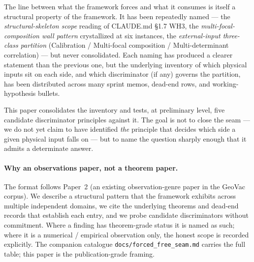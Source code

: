 \documentclass[11pt,a4paper]{article}
\theoremstyle{plain}
\theoremstyle{definition}
\begin{document}
The line between what the framework forces and what it consumes is itself a structural property of the framework. It has been repeatedly named --- the \emph{structural-skeleton scope} reading of CLAUDE.md \S 1.7 WH3, the \emph{multi-focal-composition wall pattern} crystallized at six instances, the \emph{external-input three-class partition} (Calibration / Multi-focal composition / Multi-determinant correlation) --- but never consolidated. Each naming has produced a clearer statement than the previous one, but the underlying inventory of which physical inputs sit on each side, and which discriminator (if any) governs the partition, has been distributed across many sprint memos, dead-end rows, and working-hypothesis bullets.

This paper consolidates the inventory and tests, at preliminary level, five candidate discriminator principles against it. The goal is not to close the seam --- we do not yet claim to have identified \emph{the} principle that decides which side a given physical input falls on --- but to name the question sharply enough that it admits a determinate answer.

\paragraph{Why an observations paper, not a theorem paper.}
The format follows Paper~2 (an existing observation-genre paper in the GeoVac corpus). We describe a structural pattern that the framework exhibits across multiple independent domains, we cite the underlying theorems and dead-end records that establish each entry, and we probe candidate discriminators without commitment. Where a finding has theorem-grade status it is named as such; where it is a numerical / empirical observation only, the honest scope is recorded explicitly. The companion catalogue \texttt{docs/forced\_free\_seam.md} carries the full table; this paper is the publication-grade framing.
\end{document}
